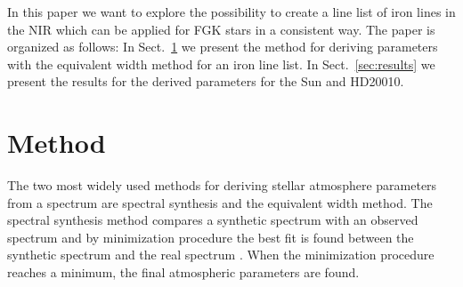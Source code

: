 \documentclass{aa}
\begin{document}
In this paper we want to explore the possibility to create a
line list of iron lines in the NIR which can be applied for FGK
stars in a consistent way. The paper is organized as follows:
In Sect.~\ref{sec:method} we present the method for deriving
parameters with the equivalent width method for an iron line list.
In Sect.~\ref{sec:results} we present the results for the derived
parameters for the Sun and HD20010.









\section{Method}
\label{sec:method}

The two most widely used methods for deriving stellar atmosphere
parameters from a spectrum are spectral synthesis and the equivalent
width method. The spectral synthesis method compares a synthetic
spectrum with an observed spectrum and by minimization procedure the
best fit is found between the synthetic spectrum and the real spectrum
\citep[see e.g.][]{Valenti2005,Onehag2012}. When the minimization
procedure reaches a minimum, the final atmospheric parameters are found.
\end{document}
